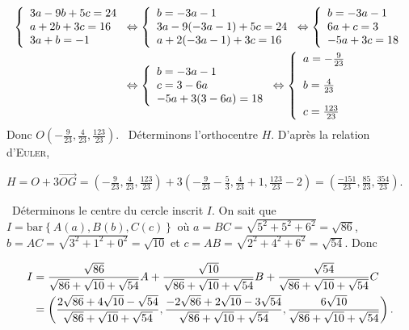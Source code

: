 {{\begin{align*}\ensuremath
\left\{
\begin{array}{l}
3a-9b+5c=24\\
a+2b+3c=16\\
3a+b=-1
\end{array}
\right.&\Leftrightarrow\left\{
\begin{array}{l}
b=-3a-1\\
3a-9(-3a-1)+5c=24\\
a+2(-3a-1)+3c=16
\end{array}
\right.\Leftrightarrow\left\{
\begin{array}{l}
b=-3a-1\\
6a+c=3\\
-5a+3c=18
\end{array}
\right.\\
 &\Leftrightarrow\left\{
\begin{array}{l}
b=-3a-1\\
c=3-6a\\
-5a+3(3-6a)=18
\end{array}
\right.
\Leftrightarrow\left\{
\begin{array}{l}
a=-\frac{9}{23}\\
b=\frac{4}{23}\rule{0mm}{7mm}\\
c=\frac{123}{23}\rule{0mm}{7mm}
\end{array}
\right.
\end{align*}
Donc $O\left(-\frac{9}{23},\frac{4}{23},\frac{123}{23}\right)$.
\textbullet~Déterminons l'orthocentre $H$. D'après la relation d'\textsc{Euler},

\begin{center}
$H=O+3\overrightarrow{OG}=\left(-\frac{9}{23},\frac{4}{23},\frac{123}{23}\right)+3\left(-\frac{9}{23}-\frac{5}{3},\frac{4}{23}+1,\frac{123}{23}-2\right)=\left(\frac{-151}{23},\frac{85}{23},\frac{354}{23}\right)$.
\end{center}
\textbullet~Déterminons le centre du cercle inscrit $I$. On sait que $I=\text{bar}\left\{A(a),B(b),C(c)\right\}$ où $a=BC=\sqrt{5^2+5^2+6^2}=\sqrt{86}$, $b=AC=\sqrt{3^2+1^2+0^2}=\sqrt{10}$ et $c=AB=\sqrt{2^2+4^2+6^2}=\sqrt{54}$. Donc

\begin{align*}\ensuremath
I&=\frac{\sqrt{86}}{\sqrt{86}+\sqrt{10}+\sqrt{54}}A
+\frac{\sqrt{10}}{\sqrt{86}+\sqrt{10}+\sqrt{54}}B+\frac{\sqrt{54}}{\sqrt{86}+\sqrt{10}+\sqrt{54}}C\\
 &=\left(
 \frac{2\sqrt{86}+4\sqrt{10}-\sqrt{54}}{\sqrt{86}+\sqrt{10}+\sqrt{54}},
 \frac{-2\sqrt{86}+2\sqrt{10}-3\sqrt{54}}{\sqrt{86}+\sqrt{10}+\sqrt{54}},
 \frac{6\sqrt{10}}{\sqrt{86}+\sqrt{10}+\sqrt{54}}
 \right).
\end{align*}

}}
